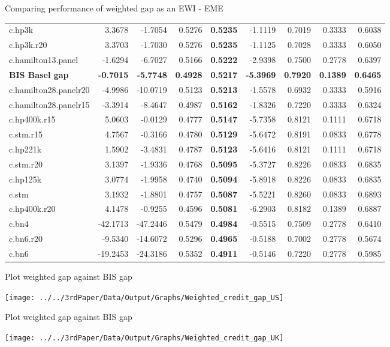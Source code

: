 \documentclass[
  ignorenonframetext,
]{beamer}
\begin{document}
\begin{frame}{Comparing performance of weighted gap as an EWI - EME}
{\begin{tabular}[t]{lrrr>{}rrrrr}
c.hp3k & 3.3678 & -1.7054 & 0.5276 & \textbf{0.5235} & -1.1119 & 0.7019 & 0.3333 & 0.6038\\
c.hp3k.r20 & 3.3703 & -1.7030 & 0.5276 & \textbf{0.5235} & -1.1125 & 0.7028 & 0.3333 & 0.6050\\
c.hamilton13.panel & -1.6294 & -6.7027 & 0.5166 & \textbf{0.5222} & -2.9398 & 0.7500 & 0.2778 & 0.6397\\
\textbf{BIS Basel gap} & \textbf{-0.7015} & \textbf{-5.7748} & \textbf{0.4928} & \textbf{\textbf{0.5217}} & \textbf{-5.3969} & \textbf{0.7920} & \textbf{0.1389} & \textbf{0.6465}\\
c.hamilton28.panelr20 & -4.9986 & -10.0719 & 0.5123 & \textbf{0.5213} & -1.5578 & 0.6932 & 0.3333 & 0.5916\\
\addlinespace
c.hamilton28.panelr15 & -3.3914 & -8.4647 & 0.4987 & \textbf{0.5162} & -1.8326 & 0.7220 & 0.3333 & 0.6324\\
c.hp400k.r15 & 5.0603 & -0.0129 & 0.4777 & \textbf{0.5147} & -5.7358 & 0.8121 & 0.1111 & 0.6718\\
c.stm.r15 & 4.7567 & -0.3166 & 0.4780 & \textbf{0.5129} & -5.6472 & 0.8191 & 0.0833 & 0.6778\\
c.hp221k & 1.5902 & -3.4831 & 0.4787 & \textbf{0.5123} & -5.6416 & 0.8121 & 0.1111 & 0.6718\\
c.stm.r20 & 3.1397 & -1.9336 & 0.4768 & \textbf{0.5095} & -5.3727 & 0.8226 & 0.0833 & 0.6835\\
\addlinespace
c.hp125k & 3.0774 & -1.9958 & 0.4740 & \textbf{0.5094} & -5.8918 & 0.8226 & 0.0833 & 0.6835\\
c.stm & 3.1932 & -1.8801 & 0.4757 & \textbf{0.5087} & -5.5221 & 0.8260 & 0.0833 & 0.6893\\
c.hp400k.r20 & 4.1478 & -0.9255 & 0.4596 & \textbf{0.5081} & -6.2903 & 0.8182 & 0.1389 & 0.6887\\
c.bn4 & -42.1713 & -47.2446 & 0.5479 & \textbf{0.4984} & -0.5515 & 0.7509 & 0.2778 & 0.6410\\
c.bn6.r20 & -9.5340 & -14.6072 & 0.5296 & \textbf{0.4965} & -0.5188 & 0.7002 & 0.2778 & 0.5674\\
\addlinespace
c.bn6 & -19.2453 & -24.3186 & 0.5352 & \textbf{0.4911} & -0.5146 & 0.7220 & 0.2778 & 0.5985\\
\bottomrule
\end{tabular}}
\end{frame}

\begin{frame}{Plot weighted gap against BIS gap}
\protect\hypertarget{plot-weighted-gap-against-bis-gap}{}
\begin{center}\texttt{[image: ../../3rdPaper/Data/Output/Graphs/Weighted\_credit\_gap\_US]} \end{center}
\end{frame}

\begin{frame}{Plot weighted gap against BIS gap}
\protect\hypertarget{plot-weighted-gap-against-bis-gap-1}{}
\begin{center}\texttt{[image: ../../3rdPaper/Data/Output/Graphs/Weighted\_credit\_gap\_UK]} \end{center}
\end{frame}
\end{document}
